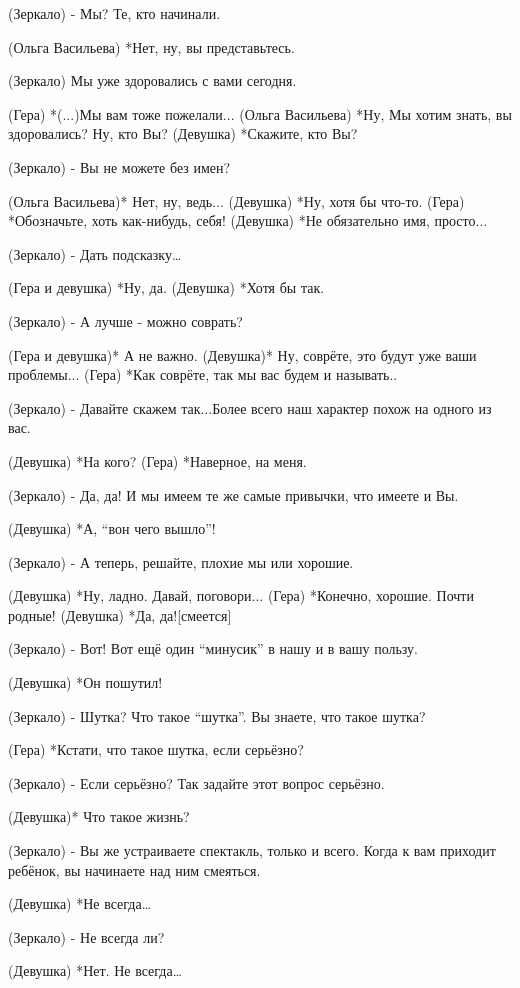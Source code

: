(Зеркало) - Мы? Те, кто начинали.

(Ольга Васильева) *Нет, ну, вы представьтесь.

(Зеркало) Мы уже здоровались с вами сегодня.

(Гера) *(...)Мы вам тоже пожелали...
(Ольга Васильева) *Ну, Мы хотим знать, вы здоровались? Ну, кто Вы?
(Девушка) *Скажите, кто Вы?

(Зеркало) - Вы не можете без имен? 

(Ольга Васильева)* Нет, ну, ведь...
(Девушка) *Ну, хотя бы что-то.
(Гера) *Обозначьте, хоть как-нибудь, себя!
(Девушка) *Не обязательно имя, просто...

(Зеркало) - Дать подсказку…

(Гера и девушка) *Ну, да.
(Девушка) *Хотя бы так.

(Зеркало) - А лучше - можно соврать?

(Гера и девушка)* А не важно.
(Девушка)* Ну, соврёте, это будут уже ваши проблемы...
(Гера) *Как соврёте,  так мы вас будем и называть..

(Зеркало) - Давайте скажем так...Более всего наш характер похож на одного из вас.

(Девушка) *На кого?
(Гера) *Наверное, на меня.

(Зеркало)  - Да, да! И мы имеем те же самые привычки, что имеете и Вы.

(Девушка) *А, “вон чего вышло”!

(Зеркало)  - А теперь, решайте, плохие мы или хорошие.

(Девушка) *Ну, ладно. Давай, поговори...
(Гера) *Конечно, хорошие.  Почти родные!
(Девушка) *Да, да![смеется]

(Зеркало) - Вот! Вот ещё один “минусик” в нашу и в вашу пользу.

(Девушка) *Он пошутил!

(Зеркало) - Шутка? Что такое “шутка”. Вы знаете, что такое шутка?

(Гера) *Кстати, что такое шутка, если серьёзно?

(Зеркало) - Если серьёзно? Так задайте этот вопрос серьёзно. 

(Девушка)* Что такое жизнь?

(Зеркало) - Вы же устраиваете спектакль, только и всего. Когда к вам приходит ребёнок, вы начинаете над ним смеяться. 

(Девушка) *Не всегда…

(Зеркало) - Не всегда ли?

(Девушка) *Нет. Не всегда…

